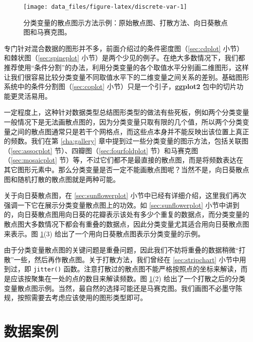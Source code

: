 \documentclass[
  b5paper,
  UTF8,twoside]{book}
\begin{document}
\begin{figure}

{\centering \texttt{[image: data\_files/figure-latex/discrete-var-1]} 

}

\caption[分类变量的散点图示方法示例]{分类变量的散点图示方法示例：原始散点图、打散方法、向日葵散点图和马赛克图。}\label{fig:discrete-var}
\end{figure}



专门针对混合数据的图形并不多，前面介绍过的条件密度图（\ref{sec:cdplot} 小节）和棘状图（\ref{sec:spineplot} 小节）是两个少见的例子。在绝大多数情况下，我们都推荐使用``条件分割''的办法，利用分类变量的各个取值水平分别画二维图形，这样让我们很容易比较分类变量不同取值水平下的二维变量之间关系的差别。基础图形系统中的条件分割图（\ref{sec:coplot} 小节）只是一个引子，\textbf{ggplot2} 包中的切片功能更灵活易用。

一定程度上，这种针对数据类型总结图形类型的做法有些死板，例如两个分类变量一般情况下是无法画散点图的，因为分类变量只取有限的几个值，所以两个分类变量之间的散点图通常只是若干个网格点，而这些点本身并不能反映出该位置上真正的频数。我们在第 \ref{cha:gallery} 章中提到过一些分类变量的图示方法，包括关联图（\ref{sec:assocplot} 节）、四瓣图（\ref{sec:fourfoldplot} 节）和马赛克图（\ref{sec:mosaicplot} 节）等，不过它们都不是最直接的散点图，而是将频数表达在其它图形元素中。那么分类变量是否一定不能画散点图呢？当然不是，向日葵散点图和随机打散的散点图就是两种可能。

关于向日葵散点图，在 \ref{sec:sunflowerplot} 小节中已经有详细介绍，这里我们再次强调一下它在展示分类变量散点图上的功效。如 \ref{sec:sunflowerplot} 小节中讲到的，向日葵散点图用向日葵的花瓣表示该处有多少个重复的数据点，而分类变量的散点图大多数情况下都会有重叠的数据点，因此分类变量尤其适合用向日葵散点图来表示。图 \ref{fig:discrete-var}(3) 给出了一个用向日葵散点图表示分类变量的示例。

由于分类变量散点图的关键问题是重叠问题，因此我们不妨将重叠的数据稍微``打散''一些，然后再作散点图。关于打散方法，我们曾经在 \ref{sec:stripchart} 小节中用到过，即 \texttt{jitter()} 函数。注意打散过的散点图不能严格按照点的坐标来解读，而是应该按聚集在一处的点的数目来解读频数。图 \ref{fig:discrete-var}(2) 给出了一个打散之后的分类变量散点图示例。当然，最自然的选择可能还是马赛克图。我们画图不必墨守陈规，按照需要去考虑应该使用的图形类型即可。

\section{数据案例}\label{sec:data-case}
\end{document}
